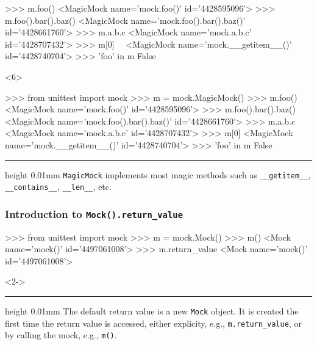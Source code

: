 \documentclass[xcolor={svgnames}]{beamer}
\newcommand{\ttcode}[2][]{\lstinline[style=plain,basicstyle=\ttfamily#1]{#2}}
\newcommand{\pycode}[2][]{\lstinline[style=python,#1]{#2}}
\newcommand{\hr}[2]{\vspace{#1}\hrule height 0.01mm\vspace{#2}}
\begin{document}
\begin{frame}[t,fragile]
\begin{onlyenv}
\begin{pyenv}[gobble=12]
            >>> m.foo()
            <MagicMock name='mock.foo()' id='4428595096'>
            >>> m.foo().bar().baz()
            <MagicMock name='mock.foo().bar().baz()' id='4428661760'>
            >>> m.a.b.c
            <MagicMock name='mock.a.b.c' id='4428707432'>
            >>> m[0]~~
            <MagicMock name='mock.__getitem__()' id='4428740704'>
            >>> 'foo' in m
            False
        \end{pyenv}
    \end{onlyenv}
    \begin{onlyenv}<6>
        \begin{pyenv}[gobble=12]
            >>> from unittest import mock
            >>> m = mock.MagicMock()
            >>> m.foo()
            <MagicMock name='mock.foo()' id='4428595096'>
            >>> m.foo().bar().baz()
            <MagicMock name='mock.foo().bar().baz()' id='4428661760'>
            >>> m.a.b.c
            <MagicMock name='mock.a.b.c' id='4428707432'>
            >>> m[0]
            <MagicMock name='mock.__getitem__()' id='4428740704'>
            >>> 'foo' in m
            False
        \end{pyenv}
        \hr{1mm}{1mm}
        \pycode{MagicMock} implements most magic methods such as
        \pycode{__getitem__}, \pycode{__contains__},
        \pycode{__len__}, etc.
    \end{onlyenv}
\end{frame}


\begin{frame}[t,fragile]
    \frametitle{Introduction to \ttcode{Mock().return_value}}

    \begin{pyenv}[gobble=8]
        >>> from unittest import mock
        >>> m = mock.Mock()
        >>> m()
        <Mock name='mock()' id='4497061008'>
        >>> m.return_value
        <Mock name='mock()' id='4497061008'>
    \end{pyenv}

    \begin{onlyenv}<2->
        \hr{0.5mm}{0.5mm}
        The default return value is a new \pycode{Mock} object.
        It is created the first time the return value is accessed,
        either explicity, e.g., \pycode{m.return_value}, or by calling
        the mock, e.g., \pycode{m()}.
    \end{onlyenv}
\end{frame}
\end{document}
